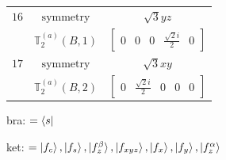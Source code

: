 \documentclass[fleqn,8pt,landscape]{jsarticle}
\begin{document}
\begin{longtable}{ccc}
$ 16 $ & $ \text{symmetry} $ & $ \sqrt{3} y z $ \\
$  $ & $ \mathbb{T}_{2}^{(a)}(B,1) $ & $ \begin{bmatrix} 0 & 0 & 0 & \frac{\sqrt{2} i}{2} & 0 \end{bmatrix} $ \\ \hline
$ 17 $ & $ \text{symmetry} $ & $ \sqrt{3} x y $ \\
$  $ & $ \mathbb{T}_{2}^{(a)}(B,2) $ & $ \begin{bmatrix} 0 & \frac{\sqrt{2} i}{2} & 0 & 0 & 0 \end{bmatrix} $ \\ \hline
\end{longtable}
bra: $=\bra{s}$

\noindent
ket: $=\ket{f_{c}}, \ket{f_{s}}, \ket{f_{z}^{\beta}}, \ket{f_{xyz}}, \ket{f_{x}}, \ket{f_{y}}, \ket{f_{z}^{\alpha}}$
\renewcommand{\arraystretch}{1.6}
\end{document}

